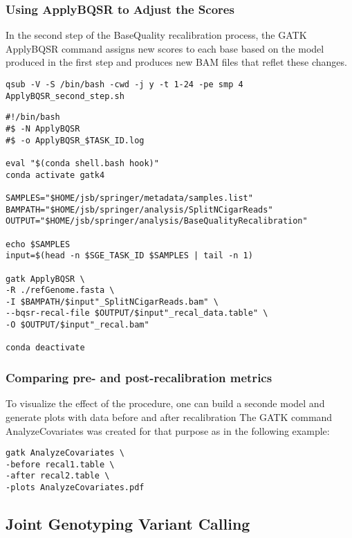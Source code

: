 \subsubsection{Using ApplyBQSR to Adjust the Scores}

In the second step of the BaseQuality recalibration process, the GATK ApplyBQSR command assigns new scores to each base based on the model produced in the first step and produces new BAM files that reflet these changes.  

\begin{verbatim}
qsub -V -S /bin/bash -cwd -j y -t 1-24 -pe smp 4  ApplyBQSR_second_step.sh
\end{verbatim}


\begin{verbatim}
#!/bin/bash
#$ -N ApplyBQSR
#$ -o ApplyBQSR_$TASK_ID.log

eval "$(conda shell.bash hook)"
conda activate gatk4

SAMPLES="$HOME/jsb/springer/metadata/samples.list"
BAMPATH="$HOME/jsb/springer/analysis/SplitNCigarReads"
OUTPUT="$HOME/jsb/springer/analysis/BaseQualityRecalibration"

echo $SAMPLES
input=$(head -n $SGE_TASK_ID $SAMPLES | tail -n 1)

gatk ApplyBQSR \
-R ./refGenome.fasta \
-I $BAMPATH/$input"_SplitNCigarReads.bam" \
--bqsr-recal-file $OUTPUT/$input"_recal_data.table" \
-O $OUTPUT/$input"_recal.bam"

conda deactivate
\end{verbatim}

\subsubsection{Comparing pre- and post-recalibration metrics}

To visualize the effect of the procedure, one can build a seconde model and generate plots with data before and after recalibration \cite{GATK_BaseQuality} The GATK command AnalyzeCovariates was created for that purpose as in the following example:

\begin{verbatim}
gatk AnalyzeCovariates \
-before recal1.table \
-after recal2.table \
-plots AnalyzeCovariates.pdf
\end{verbatim}



\subsection{Joint Genotyping Variant Calling}


